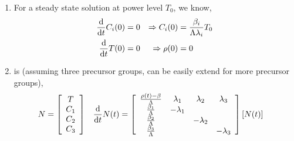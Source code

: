 \documentclass{school-22.211-notes}
\begin{document}
\begin{enumerate}
\item For a steady state solution at power level $T_0$, we know, 
  \begin{align}
    \frac{\mathrm{d}}{\mathrm{d}t} C_i (0) &= 0  &\Rightarrow  C_i (0) &= \frac{\beta_i}{\Lambda \lambda_i} T_0  \notag \\
    \frac{\mathrm{d}}{\mathrm{d}t} T(0) &= 0  &\Rightarrow \rho(0) &= 0  \label{in-hour}
  \end{align}

\item {} is (assuming three precursor groups, can be easily extend for more precursor groups),  
\begin{align}
N &= \left[ \begin{array}{c} T \\ C_1 \\ C_2 \\ C_3 \end{array} \right]  
& \frac{\mathrm{d}}{\mathrm{d}t} N(t) &= \left[ \begin{array}{cccc} 
\frac{\rho(t) - \beta}{\Lambda} & \lambda_1 & \lambda_2 & \lambda_3 \\
\frac{\beta_1}{\Lambda} & - \lambda_1 & & \\
\frac{\beta_2}{\Lambda} & & -\lambda_2 & \\
\frac{\beta_3}{\Lambda} & & & -\lambda_3 \end{array} \right] 
\left[ N(t) \right] 
\end{align}
\end{enumerate}
\end{document}
